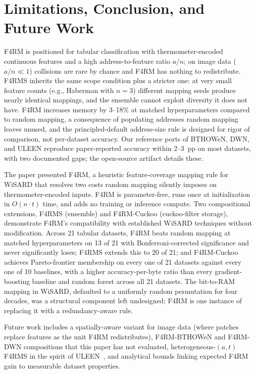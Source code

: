 
\section{Limitations, Conclusion, and Future Work}
\label{sec:closing}
\label{sec:limitations}
\label{sec:conclusion}
\label{sec:future-work}

F4RM is positioned for tabular classification with thermometer-encoded continuous features and a high address-to-feature ratio $a/n$; on image data ($a/n \ll 1$) collisions are rare by chance and F4RM has nothing to redistribute. F4RMS inherits the same scope condition plus a stricter one: at very small feature counts (e.g., Haberman with $n = 3$) different mapping seeds produce nearly identical mappings, and the ensemble cannot exploit diversity it does not have. F4RM increases memory by 3--18\% at matched hyperparameters compared to random mapping, a consequence of populating addresses random mapping leaves unused, and the principled-default address-size rule is designed for rigor of comparison, not per-dataset accuracy. Our reference ports of BTHOWeN, DWN, and ULEEN reproduce paper-reported accuracy within 2--3~pp on most datasets, with two documented gaps; the open-source artifact details these.

The paper presented F4RM, a heuristic feature-coverage mapping rule for WiSARD that resolves two costs random mapping silently imposes on thermometer-encoded inputs. F4RM is parameter-free, runs once at initialization in $O(n \cdot t)$ time, and adds no training or inference compute. Two compositional extensions, F4RMS (ensemble) and F4RM-Cuckoo (cuckoo-filter storage), demonstrate F4RM's compatibility with established WiSARD techniques without modification. Across 21 tabular datasets, F4RM beats random mapping at matched hyperparameters on 13 of 21 with Bonferroni-corrected significance and never significantly loses; F4RMS extends this to 20 of 21; and F4RM-Cuckoo achieves Pareto-frontier membership on every one of 21 datasets against every one of 10 baselines, with a higher accuracy-per-byte ratio than every gradient-boosting baseline and random forest across all 21 datasets. The bit-to-RAM mapping in WiSARD, defaulted to a uniformly random permutation for four decades, was a structural component left undesigned; F4RM is one instance of replacing it with a redundancy-aware rule.

Future work includes a spatially-aware variant for image data (where patches replace features as the unit F4RM redistributes), F4RM-BTHOWeN and F4RM-DWN compositions that this paper has not evaluated, heterogeneous-$(a, t)$ F4RMS in the spirit of ULEEN~\cite{susskind2023uleen}, and analytical bounds linking expected F4RM gain to measurable dataset properties.
